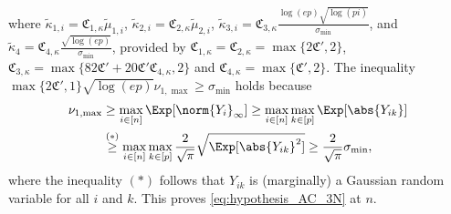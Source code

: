 \documentclass[aos]{imsart}
\begin{document}
where $\tilde\kappa_{1,i} = \mathfrak{C}_{1,\kappa} \tilde\mu_{1,i}$, 
$\tilde\kappa_{2,i} = \mathfrak{C}_{2,\kappa} \tilde\mu_{2,i}$, 
$\tilde\kappa_{3,i} = \mathfrak{C}_{3,\kappa} \frac{\log(ep)\sqrt{\log(pi)}}{\sigma_{\min}}$, and
$\tilde\kappa_{4} = \mathfrak{C}_{4,\kappa} \frac{\sqrt{\log(ep)}}{\sigma_{\min}}$, provided by $\mathfrak{C}_{1,\kappa} = \mathfrak{C}_{2,\kappa} = \max\{2 \mathfrak{C}', 2\}$, $\mathfrak{C}_{3,\kappa} = \max\{82 \mathfrak{C}' + 20 \mathfrak{C}' \mathfrak{C}_{4,\kappa}, 2\}$ and $\mathfrak{C}_{4,\kappa} = \max\{ \mathfrak{C}', 2\}$. 
The inequality $\max\{2 \mathfrak{C}', 1\} \sqrt{\log(ep)} {\nu}_{1,\max} \geq \sigma_{\min}$ holds because 
\begin{equation} \label{eq:nu_1_vs_sigma_min}
\begin{aligned}
    \nu_{1,\max} 
    & \geq \max_{i \in [n]} \Exp[\norm{Y_i}_\infty] 
    \geq \max_{i \in [n]} \max_{k \in [p]} \Exp[\abs{Y_{ik}}] \\
    & \overset{(*)}{\geq} \max_{i \in [n]} \max_{k \in [p]} \frac{2}{\sqrt{\pi}} \sqrt{\Exp[\abs{Y_{ik}}^2]} 
    \geq \frac{2}{\sqrt{\pi}} \sigma_{\min}, 
\end{aligned}
\end{equation}
where the inequality $(*)$ follows that $Y_{ik}$ is (marginally) a Gaussian random variable for all $i$ and $k$.
This proves \eqref{eq:hypothesis_AC_3N} at $n$.
\end{document}
